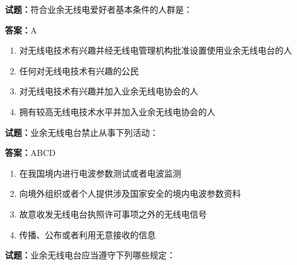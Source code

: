 \documentclass{ctexbook}
\begin{document}




\vspace{1em}

\textbf{试题：}符合业余无线电爱好者基本条件的人群是： 

\textbf{答案：}A 

\begin{enumerate}[leftmargin=3em]
  \item 对无线电技术有兴趣并经无线电管理机构批准设置使用业余无线电台的人 

  \item 任何对无线电技术有兴趣的公民 

  \item 对无线电技术有兴趣并加入业余无线电协会的人 

  \item 拥有较高无线电技术水平并加入业余无线电协会的人 

\end{enumerate}





\vspace{1em}

\textbf{试题：}业余无线电台禁止从事下列活动： 

\textbf{答案：}ABCD 

\begin{enumerate}[leftmargin=3em]
  \item 在我国境内进行电波参数测试或者电波监测 

  \item 向境外组织或者个人提供涉及国家安全的境内电波参数资料 

  \item 故意收发无线电台执照许可事项之外的无线电信号 

  \item 传播、公布或者利用无意接收的信息 

\end{enumerate}






\vspace{1em}

\textbf{试题：}业余无线电台应当遵守下列哪些规定： 
\end{document}
